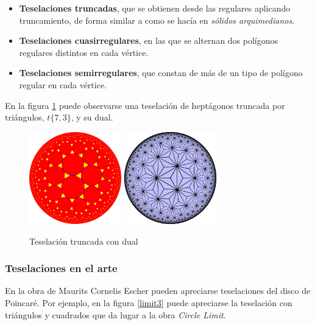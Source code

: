 \documentclass{article}
\theoremstyle{plain}
\theoremstyle{definition}
\theoremstyle{remark}
\begin{document}
\begin{itemize}
\item \textbf{Teselaciones truncadas}, que se obtienen desde las
  regulares aplicando truncamiento, de forma similar a como se hacía
  en \textit{sólidos arquimedianos}.
\item \textbf{Teselaciones cuasirregulares}, en las que se alternan
  dos polígonos regulares distintos en cada vértice.
\item \textbf{Teselaciones semirregulares}, que constan de más de un
  tipo de polígono regular en cada vértice.
\end{itemize}

En la figura \ref{tilingt7} puede observarse una teselación de heptágonos
truncada por triángulos, $t\{7,3\}$, y su dual.

\begin{figure}[ht!]
  \centering
  \includegraphics[width=40mm]{./tiling73t.png}
  \includegraphics[width=40mm]{./tiling73tdual.png}
  \caption{Teselación truncada con dual\label{tilingt7}}
\end{figure}

\subsubsection{Teselaciones en el arte}
En la obra de Maurits Cornelis Escher pueden apreciarse teselaciones
del disco de Poincaré. Por ejemplo, en la figura \ref{limit3} puede apreciarse
la teselación con triángulos y cuadrados que da lugar a la obra
\textit{Circle Limit}.
\end{document}
